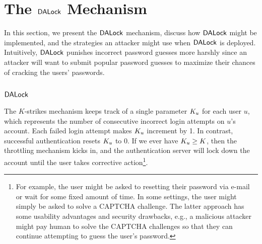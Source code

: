 
\vspace*{-\baselineskip}
\section{The $\mathsf{DALock}$ Mechanism}\label{sec:DALockAlgorithm} %

In this section, we present the $\mathsf{DALock}$ mechanism, discuss how $\mathsf{DALock}$ might be implemented, and the strategies an attacker might use when $\mathsf{DALock}$ is deployed. Intuitively, $\mathsf{DALock}$ punishes incorrect password guesses more harshly since an attacker will want to submit popular password guesses to maximize their chances of cracking the users' passwords.
\vspace*{-\baselineskip}
\subsection{$\mathsf{DALock}$} %

The $K$-strikes mechanism keeps track of a single parameter $K_u$ for each user $u$, which represents the number of consecutive incorrect login attempts on $u$’s account. Each failed login attempt makes $K_u$ increment by 1. In contrast, successful authentication resets $K_u$ to 0. If we ever have $K_u \geq K$, then the throttling mechanism kicks in, and the authentication server will lock down the account until the user takes corrective action\footnote{For example, the user might be asked to resetting their password via e-mail or wait for some fixed amount of time. In some settings, the user might simply be asked to solve a CAPTCHA challenge. The latter approach has some usability advantages and security drawbacks, e.g., a malicious attacker might pay human to solve the CAPTCHA challenges so that they can continue attempting to guess the user's password.}.

